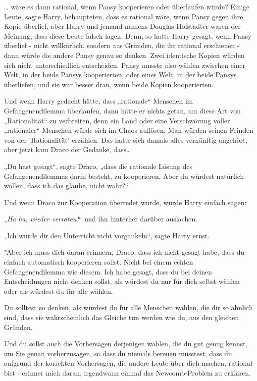 {… wäre es dann rational, wenn Pansy kooperieren oder überlaufen würde? Einige Leute, sagte Harry, behaupteten, dass es rational wäre, wenn Pansy gegen ihre Kopie überlief, aber Harry und jemand namens Douglas Hofstadter waren der Meinung, dass diese Leute falsch lagen. Denn, so hatte Harry gesagt, wenn Pansy überlief - nicht willkürlich, sondern aus Gründen, die ihr rational erschienen - dann würde die andere Pansy genau so denken. Zwei identische Kopien würden sich nicht unterschiedlich entscheiden. Pansy musste also wählen zwischen einer Welt, in der beide Pansys kooperierten, oder einer Welt, in der beide Pansys überliefen, und sie war besser dran, wenn beide Kopien kooperierten.

Und wenn Harry gedacht hätte, dass „rationale“ Menschen im Gefangenendilemma überlaufen, dann hätte er nichts getan, um diese Art von „Rationalität“ zu verbreiten, denn ein Land oder eine Verschwörung voller „rationaler“ Menschen würde sich im Chaos auflösen. Man würden seinen Feinden von der 'Rationalität' erzählen. Das hatte sich damals alles vernünftig angehört, aber jetzt kam Draco der Gedanke, dass…

„Du hast gesagt“, sagte Draco, „dass die rationale Lösung des Gefangenendilemmas darin besteht, zu kooperieren. Aber du würdest natürlich wollen, dass ich das glaube, nicht wahr?“

Und wenn Draco zur Kooperation überredet würde, würde Harry einfach sagen:

„\emph{Ha ha, wieder verraten!}“ und ihn hinterher darüber auslachen.

„Ich würde dir den Unterricht nicht vorgaukeln“, sagte Harry ernst.

"Aber ich muss dich daran erinnern, Draco, dass ich nicht gesagt habe, dass du einfach automatisch kooperieren sollst. Nicht bei einem echten Gefangenendilemma wie diesem. Ich habe gesagt, dass du bei deinen Entscheidungen nicht denken sollst, als würdest du nur für dich selbst wählen oder als würdest du für alle wählen.

Du solltest so denken, als würdest du für alle Menschen wählen, die dir so ähnlich sind, dass sie wahrscheinlich das Gleiche tun werden wie du, aus den gleichen Gründen.

Und du sollst auch die Vorhersagen derjenigen wählen, die du gut genug kennst, um Sie genau vorherzusagen, so dass du niemals bereuen müsstest, dass du aufgrund der korrekten Vorhersagen, die andere Leute über dich machen, rational bist - erinner mich daran, irgendwann einmal das Newcomb-Problem zu erklären.

}
